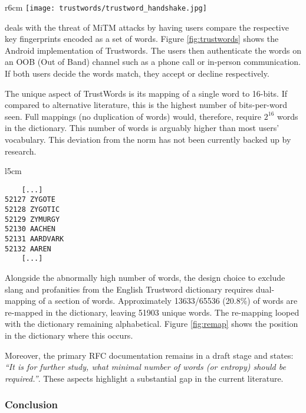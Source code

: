 \begin{wrapfigure}{r}{6cm}
    \centering
    \texttt{[image: trustwords/trustword\_handshake.jpg]}
    \caption{Trustword fingerprint verification}
    \label{fig:trustwords}
\end{wrapfigure}

\pep deals with the threat of MiTM attacks by having users compare the respective key fingerprints encoded as a set of words. Figure \ref{fig:trustwords} shows the \pep Android implementation of Trustwords. The users then authenticate the words on an OOB (Out of Band) channel such as a phone call or in-person communication. If both users decide the words match, they accept or decline respectively.

The unique aspect of TrustWords is its mapping of a single word to 16-bits. If compared to alternative literature, this is the highest number of bits-per-word seen. Full mappings (no duplication of words) would, therefore, require $2^{16}$ words in the dictionary. This number of words is arguably higher than most users' vocabulary. This deviation from the norm has not been currently backed up by research. 

\begin{wrapfigure}{l}{5cm}
    \centering
    \begin{BVerbatim}
    [...]
52127 ZYGOTE
52128 ZYGOTIC
52129 ZYMURGY
52130 AACHEN
52131 AARDVARK
52132 AAREN
    [...]
    \end{BVerbatim}
    \caption{Re-mapping position in Trustword dictionary}
    \label{fig:remap}
\end{wrapfigure}

Alongside the abnormally high number of words, the design choice to exclude slang and profanities from the English Trustword dictionary requires dual-mapping of a section of words. Approximately 13633/65536 (20.8\%) of words are re-mapped in the dictionary, leaving 51903 unique words. The re-mapping looped with the dictionary remaining alphabetical. Figure \ref{fig:remap} shows the position in the dictionary where this occurs.

Moreover, the primary RFC documentation remains in a draft stage and states: \textit{``It is for further study, what minimal number of words (or entropy) should be required.''}. These aspects highlight a substantial gap in the current literature.

\subsubsection*{Conclusion}

